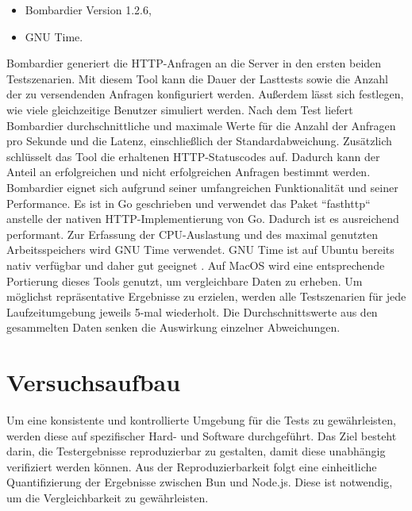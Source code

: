 \begin{itemize}
	\item Bombardier Version 1.2.6,
	\item GNU Time.
\end{itemize}

\noindent
Bombardier generiert die HTTP-Anfragen an die Server in den ersten beiden Testszenarien. Mit diesem Tool kann die Dauer der Lasttests sowie die Anzahl der zu versendenden Anfragen konfiguriert werden. Außerdem lässt sich festlegen, wie viele gleichzeitige Benutzer simuliert werden. Nach dem Test liefert Bombardier durchschnittliche und maximale Werte für die Anzahl der Anfragen pro Sekunde und die Latenz, einschließlich der Standardabweichung. Zusätzlich schlüsselt das Tool die erhaltenen HTTP-Statuscodes auf. Dadurch kann der Anteil an erfolgreichen und nicht erfolgreichen Anfragen bestimmt werden. Bombardier eignet sich aufgrund seiner umfangreichen Funktionalität und seiner Performance. Es ist in Go geschrieben und verwendet das Paket ``fasthttp`` anstelle der nativen HTTP-Implementierung von Go. Dadurch ist es ausreichend performant.\cite{Fedoseev.2016}\newline
Zur Erfassung der CPU-Auslastung und des maximal genutzten Arbeitsspeichers wird GNU Time verwendet. GNU Time ist auf Ubuntu bereits nativ verfügbar und daher gut geeignet \cite{FreeSoftwareFoundation.2018}. Auf MacOS wird eine entsprechende Portierung dieses Tools genutzt, um vergleichbare Daten zu erheben.\newline
Um möglichst repräsentative Ergebnisse zu erzielen, werden alle Testszenarien für jede Laufzeitumgebung jeweils 5-mal wiederholt. Die Durchschnittswerte aus den gesammelten Daten senken die Auswirkung einzelner Abweichungen.


\section{Versuchsaufbau} \label{sec:performance-testSetup}
Um eine konsistente und kontrollierte Umgebung für die Tests zu gewährleisten, werden diese auf spezifischer Hard- und Software durchgeführt. Das Ziel besteht darin, die Testergebnisse reproduzierbar zu gestalten, damit diese unabhängig verifiziert werden können. Aus der Reproduzierbarkeit folgt eine einheitliche Quantifizierung der Ergebnisse zwischen Bun und Node.js. Diese ist notwendig, um die Vergleichbarkeit zu gewährleisten.

